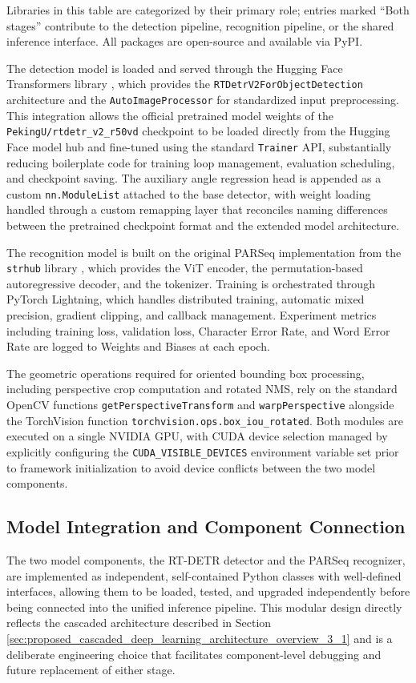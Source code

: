 Libraries in this table are categorized by their primary role; entries marked ``Both stages'' contribute to the detection pipeline, recognition pipeline, or the shared inference interface. All packages are open-source and available via PyPI.

The detection model is loaded and served through the Hugging Face Transformers library \cite{Wolf2020}, which provides the \texttt{RTDetrV2ForObjectDetection} architecture and the \texttt{AutoImageProcessor} for standardized input preprocessing. This integration allows the official pretrained model weights of the \texttt{PekingU/rtdetr\_v2\_r50vd} checkpoint to be loaded directly from the Hugging Face model hub and fine-tuned using the standard \texttt{Trainer} API, substantially reducing boilerplate code for training loop management, evaluation scheduling, and checkpoint saving. The auxiliary angle regression head is appended as a custom \texttt{nn.ModuleList} attached to the base detector, with weight loading handled through a custom remapping layer that reconciles naming differences between the pretrained checkpoint format and the extended model architecture.

The recognition model is built on the original PARSeq implementation from the \texttt{strhub} library \cite{Bautista2022}, which provides the ViT encoder, the permutation-based autoregressive decoder, and the tokenizer. Training is orchestrated through PyTorch Lightning, which handles distributed training, automatic mixed precision, gradient clipping, and callback management. Experiment metrics including training loss, validation loss, Character Error Rate, and Word Error Rate are logged to Weights and Biases at each epoch.

The geometric operations required for oriented bounding box processing, including perspective crop computation and rotated NMS, rely on the standard OpenCV functions \texttt{getPerspectiveTransform} and \texttt{warpPerspective} alongside the TorchVision function \texttt{torchvision.ops.box\_iou\_rotated}. Both modules are executed on a single NVIDIA GPU, with CUDA device selection managed by explicitly configuring the \texttt{CUDA\_VISIBLE\_DEVICES} environment variable set prior to framework initialization to avoid device conflicts between the two model components.

\subsection{Model Integration and Component Connection}
The two model components, the RT-DETR detector and the PARSeq recognizer, are implemented as independent, self-contained Python classes with well-defined interfaces, allowing them to be loaded, tested, and upgraded independently before being connected into the unified inference pipeline. This modular design directly reflects the cascaded architecture described in Section \ref{sec:proposed_cascaded_deep_learning_architecture_overview_3_1} and is a deliberate engineering choice that facilitates component-level debugging and future replacement of either stage.

